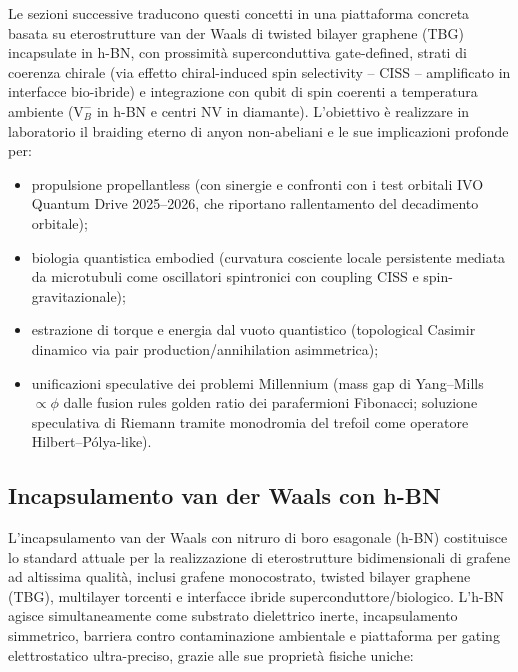 \documentclass[11pt,a4paper]{article}
\theoremstyle{plain}
\theoremstyle{definition}
\begin{document}
Le sezioni successive traducono questi concetti in una piattaforma concreta basata su eterostrutture van der Waals di twisted bilayer graphene (TBG) incapsulate in h-BN, con prossimità superconduttiva gate-defined, strati di coerenza chirale (via effetto chiral-induced spin selectivity -- CISS -- amplificato in interfacce bio-ibride) e integrazione con qubit di spin coerenti a temperatura ambiente ($\mathrm{V}_B^-$ in h-BN e centri NV in diamante). L'obiettivo è realizzare in laboratorio il braiding eterno di anyon non-abeliani e le sue implicazioni profonde per:

\begin{itemize}
    \item propulsione propellantless (con sinergie e confronti con i test orbitali IVO Quantum Drive 2025--2026, che riportano rallentamento del decadimento orbitale);
    \item biologia quantistica embodied (curvatura cosciente locale persistente mediata da microtubuli come oscillatori spintronici con coupling CISS e spin-gravitazionale);
    \item estrazione di torque e energia dal vuoto quantistico (topological Casimir dinamico via pair production/annihilation asimmetrica);
    \item unificazioni speculative dei problemi Millennium (mass gap di Yang--Mills $\propto \phi$ dalle fusion rules golden ratio dei parafermioni Fibonacci; soluzione speculativa di Riemann tramite monodromia del trefoil come operatore Hilbert--Pólya-like).
\end{itemize}



\vspace{0.3cm}









\subsection{Incapsulamento van der Waals con h-BN}

L'incapsulamento van der Waals con nitruro di boro esagonale (h-BN) costituisce lo standard attuale per la realizzazione di eterostrutture bidimensionali di grafene ad altissima qualità, inclusi grafene monocostrato, twisted bilayer graphene (TBG), multilayer torcenti e interfacce ibride superconduttore/biologico. L'h-BN agisce simultaneamente come substrato dielettrico inerte, incapsulamento simmetrico, barriera contro contaminazione ambientale e piattaforma per gating elettrostatico ultra-preciso, grazie alle sue proprietà fisiche uniche:
\end{document}
